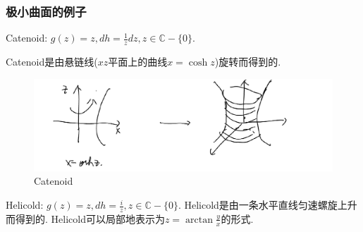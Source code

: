 \subsubsection{极小曲面的例子}
Catenoid: $g(z)=z, dh=\frac{1}{z}dz, z \in \mathbb{C}-\{0\}$.  
\par Catenoid是由悬链线($xz$平面上的曲线$x=\cosh z$)旋转而得到的.

\begin{figure}[ht]
	\centering
	\includegraphics[scale=0.5]{images/catenoid.png}
	\caption{Catenoid}
	\label{catenoidp}
\end{figure}


Helicold: $g(z)=z, dh= \frac{i}{z}, z \in \mathbb{C}-\{0\}$.
Helicold是由一条水平直线匀速螺旋上升而得到的. Helicold可以局部地表示为$z=\arctan\frac{y}{x}$的形式.

